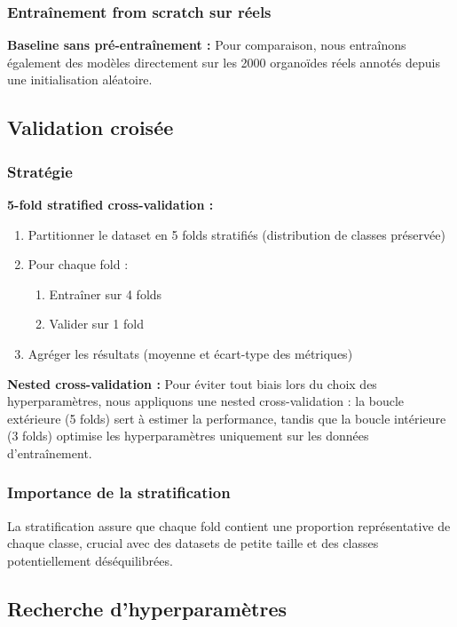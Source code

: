 \subsubsection{Entraînement from scratch sur réels}

\textbf{Baseline sans pré-entraînement :}
Pour comparaison, nous entraînons également des modèles directement sur les 2000 organoïdes réels annotés depuis une initialisation aléatoire.

\subsection{Validation croisée}

\subsubsection{Stratégie}

\textbf{5-fold stratified cross-validation :}
\begin{enumerate}
    \item Partitionner le dataset en 5 folds stratifiés (distribution de classes préservée)
    \item Pour chaque fold :
    \begin{enumerate}
        \item Entraîner sur 4 folds
        \item Valider sur 1 fold
    \end{enumerate}
    \item Agréger les résultats (moyenne et écart-type des métriques)
\end{enumerate}

\textbf{Nested cross-validation :}
Pour éviter tout biais lors du choix des hyperparamètres, nous appliquons une nested cross-validation : la boucle extérieure (5 folds) sert à estimer la performance, tandis que la boucle intérieure (3 folds) optimise les hyperparamètres uniquement sur les données d’entraînement.

\subsubsection{Importance de la stratification}

La stratification assure que chaque fold contient une proportion représentative de chaque classe, crucial avec des datasets de petite taille et des classes potentiellement déséquilibrées.

\subsection{Recherche d'hyperparamètres}


